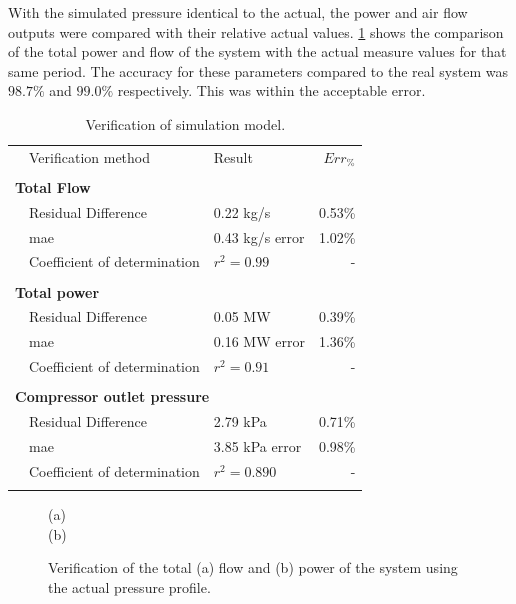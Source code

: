 	With the simulated pressure identical to the actual, the power and air flow outputs were compared with their relative actual values. \cref{fig: Verification Power kusasalethu} shows the comparison of the total power and flow of the system with the actual measure values for that same period. The accuracy for these parameters compared to the real system was $98.7 \%$ and $99.0 \%$ respectively. This was within the acceptable error. 
 
  \begin{table}[h!]
 	\label{Kus verification table}
 	\centering
 	\begin{tabular}{p{0.5cm}p{8cm}p{5cm}r}
 		\hline
 		&Verification method & Result & $Err_{\%}$\\
 		\hhline{====}
 		\\ \multicolumn{4}{l}{\textbf{ Total Flow}}\\
 		&Residual Difference          & 0.22 kg/s  & 0.53\% \\
 		&\gls{mae} 					 & 0.43 kg/s error & 1.02\% \\
 		&Coefficient of determination & $r^2 =0.99$   & -\\ 
 		\\ \multicolumn{4}{l}{\textbf{ Total power}}\\
 		&Residual Difference          & 0.05 MW  & 0.39\% \\
 		&\gls{mae} 					 & 0.16 MW error & 1.36\% \\
 		&Coefficient of determination & $r^2 =0.91$   & -\\ 
 		\\ \multicolumn{4}{l}{\textbf{ Compressor outlet pressure}}\\
 		&Residual Difference          & 2.79 kPa   & 0.71\% \\
 		&\gls{mae} 					 & 3.85 kPa error & 0.98\% \\
 		&Coefficient of determination & $r^2 =0.890$   & -\\
 		\\ 	\hline
 	\end{tabular} 
 	\caption{Verification of simulation model.}
 \end{table}

	\begin{figure}[h]
		\centering
		
		(a)\\
		
		(b)\\
		\caption{Verification of the total (a) flow and (b) power of the system using the actual pressure profile.}
		\label{fig: Verification Power kusasalethu}
	\end{figure}

